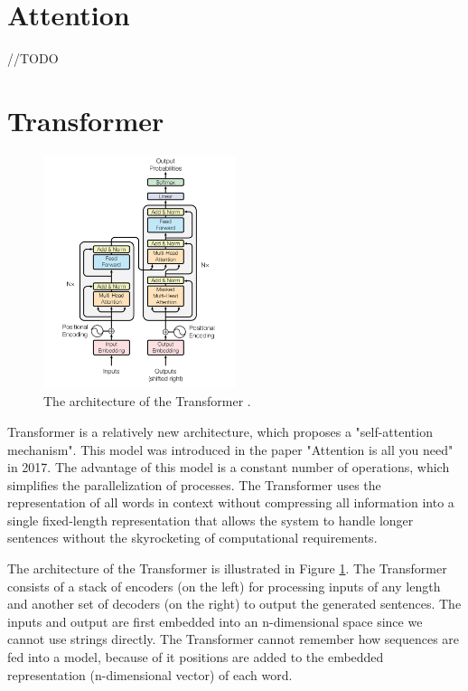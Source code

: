 \section{Attention}
//TODO

\section{Transformer} 

\begin{figure}[hbt]
  \centering
  \includegraphics[width=0.5\textwidth]{figures/transformer.png}
  \caption{The architecture of the Transformer \cite{transformer}.}
  \label{transformer}
\end{figure}
Transformer is a relatively new architecture, which proposes a "self-attention mechanism". This model was introduced in the paper "Attention is all you need" \cite{transformer} in 2017. The advantage of this model is a constant number of operations, which simplifies the parallelization of processes. The Transformer uses the representation of all words in context without compressing all information into a single fixed-length representation that allows the system to handle longer sentences without the skyrocketing of computational requirements. 

The architecture of the Transformer is illustrated in Figure \ref{transformer}. The Transformer consists of a stack of encoders (on the left) for processing inputs of any length and another set of decoders (on the right) to output the generated sentences. The inputs and output are first embedded into an n-dimensional space since we cannot use strings directly. The Transformer cannot remember how sequences are fed into a model, because of it positions are added to the embedded representation (n-dimensional vector) of each word.

